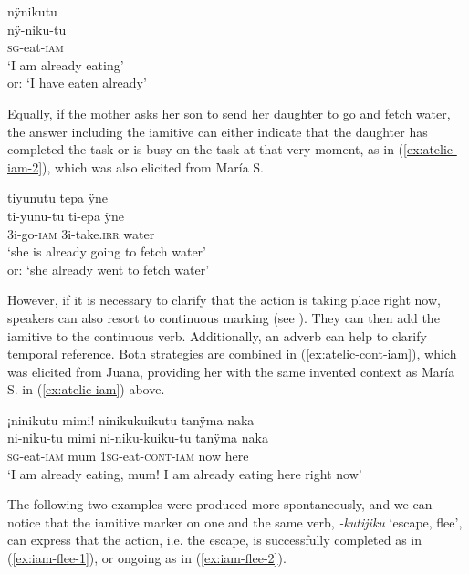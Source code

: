 \ea\label{ex:atelic-iam}
\begingl
\glpreamble nÿnikutu\\
\gla nÿ-niku-tu\\
\textsc{sg}-eat-\textsc{iam}\\
\glft ‘I am already eating’\\ or: ‘I have eaten already’
\endgl
{}
\xe
{}

Equally, if the mother asks her son to send her daughter to go and fetch water, the answer including the iamitive can either indicate that the daughter has completed the task or is busy on the task at that very moment, as in (\ref{ex:atelic-iam-2}), which was also elicited from María S.

\ea\label{ex:atelic-iam-2}
\begingl
\glpreamble tiyunutu tepa ÿne\\
\gla ti-yunu-tu ti-epa ÿne\\
\glb 3i-go-\textsc{iam} 3i-take.\textsc{irr} water\\
\glft ‘she is already going to fetch water’\\or: ‘she already went to fetch water’
\endgl
\trailingcitation{[rxx-e181022le]}
\xe
{}

However, if it is necessary to clarify that the action is taking place right now, speakers can also resort to continuous marking (see ). They can then add the iamitive to the continuous verb. Additionally, an adverb can help to clarify temporal reference. Both strategies are combined in (\ref{ex:atelic-cont-iam}), which was elicited from Juana, providing her with the same invented context as María S. in (\ref{ex:atelic-iam}) above.

\ea\label{ex:atelic-cont-iam}
\begingl
\glpreamble ¡ninikutu mimi! ninikukuikutu tanÿma naka\\
\gla ni-niku-tu mimi ni-niku-kuiku-tu tanÿma naka\\
\textsc{sg}-eat-\textsc{iam} mum 1\textsc{sg}-eat-\textsc{cont}-\textsc{iam} now here\\
\glft ‘I am already eating, mum! I am already eating here right now’
\endgl
\trailingcitation{[jxx-e181104l-3]}
\xe
{}

The following two examples were produced more spontaneously, and we can notice that the iamitive marker on one and the same verb, \textit{-kutijiku} ‘escape, flee’, can express that the action, i.e. the escape, is successfully completed as in (\ref{ex:iam-flee-1}), or ongoing as in (\ref{ex:iam-flee-2}).

